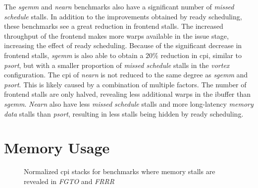 The \textit{sgemm} and \textit{nearn} benchmarks also have a significant number of \textit{missed schedule} stalls. In addition to the improvements obtained by ready scheduling, these benchmarks see a great reduction in frontend stalls. The increased throughput of the frontend makes more warps available in the issue stage, increasing the effect of ready scheduling. Because of the significant decrease in frontend stalls, \textit{sgemm} is also able to obtain a $20\%$ reduction in \acrshort{cpi}, similar to \textit{psort}, but with a smaller proportion of \textit{missed schedule} stalls in the \textit{\Gls{vortex}} configuration. The \acrshort{cpi} of \textit{nearn} is not reduced to the same degree as \textit{sgemm} and \textit{psort}. This is likely caused by a combination of multiple factors. The number of frontend stalls are only halved, revealing less additional warps in the ibuffer than \textit{sgemm}. \textit{Nearn} also have less \textit{missed schedule} stalls and more long-latency \textit{memory data} stalls than \textit{psort}, resulting in less stalls being hidden by ready scheduling.

\section{Memory Usage} \label{sec:results_memory}

\begin{figure}
    \centering
    \caption{Normalized \acrshort{cpi} stacks for benchmarks where memory stalls are revealed in \textit{FGTO} and \textit{FRRR}}
    \label{fig:exposed_memory}
\end{figure}



